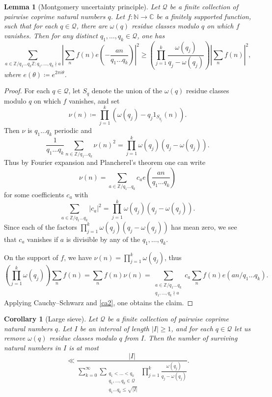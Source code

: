 \documentclass[12pt]{amsart}
\newtheorem{lemma}[theorem]{Lemma}
\newtheorem{corollary}[theorem]{Corollary}
\newcommand{\C}{\mathbb{C}}
\newcommand{\N}{\mathbb{N}}
\newcommand{\Z}{\mathbb{Z}}
\begin{document}
\begin{lemma}[Montgomery uncertainty principle]\label{montgomery} Let ${\mathcal Q}$ be a finite collection of pairwise coprime natural numbers $q$.  Let $f \colon \N \to \C$ be a finitely supported function, such that for each $q \in {\mathcal Q}$, there are $\omega(q)$ residue classes modulo $q$ on which $f$ vanishes.  Then for any distinct $q_1,\dots,q_k \in {\mathcal Q}$, one has
$$ \sum_{a \in \Z/q_1 \dots q_k\Z: q_1,\dots,q_k \nmid a} \left|\sum_n f(n) e\left(-\frac{an}{q_1 \dots q_k}\right)\right|^2 \geq \left(\prod_{j=1}^k \frac{\omega(q_j)}{q_j-\omega(q_j)}\right) |\sum_n f(n)|^2,$$
where $e(\theta) \coloneqq e^{2\pi i \theta}$.
\end{lemma}

\begin{proof}  For each $q \in {\mathcal Q}$, let $S_q$ denote the union of the $\omega(q)$ residue classes modulo $q$ on which $f$ vanishes, and set
$$ \nu(n) \coloneqq \prod_{j=1}^k (\omega(q_j) - q_j 1_{S_{q_j}}(n)).$$
Then $\nu$ is $q_1 \dots q_k$ periodic and
$$ \frac{1}{q_1 \dots q_k} \sum_{n \in \Z/q_1 \dots q_k} \nu(n)^2 = \prod_{j=1}^k \omega(q_j) (q_j - \omega(q_j)).$$
Thus by Fourier expansion and Plancherel's theorem one can write
$$ \nu(n) = \sum_{a \in \Z/q_1 \dots q_k} c_a e\left(\frac{an}{q_1 \dots q_k}\right)$$
for some coefficients $c_a$ with
\begin{equation}\label{ca2}
 \sum_{a \in \Z/q_1 \dots q_k} |c_a|^2 =  \prod_{j=1}^k \omega(q_j) (q_j - \omega(q_j)).
\end{equation}
Since each of the factors $\prod_{j=1}^k \omega(q_j) (q_j - \omega(q_j))$ has mean zero, we see that $c_a$ vanishes if $a$ is divisible by any of the $q_1,\dots,q_k$.

On the support of $f$, we have $\nu(n) = \prod_{j=1}^k \omega(q_j)$, thus
$$ \left(\prod_{j=1}^k \omega(q_j)\right) \sum_n f(n) = \sum_n f(n) \nu(n) = \sum_{\substack{a \in \Z/q_1 \dots q_k\\q_1,\dots,q_k \nmid a}} c_a \sum_n f(n) e(an/q_1 \dots q_k).$$
Applying Cauchy--Schwarz and \eqref{ca2}, one obtains the claim.
\end{proof}

\begin{corollary}[Large sieve]\label{sieve} Let ${\mathcal Q}$ be a finite collection of pairwise coprime natural numbers $q$.  Let $I$ be an interval of length $|I| \geq 1$, and for each $q \in {\mathcal Q}$ let us remove $\omega(q)$ residue classes modulo $q$ from $I$.  Then the number of surviving natural numbers in $I$ is at most
$$ \ll \frac{|I|}{\sum_{k=0}^\infty \sum_{\substack{q_1<\dots<q_k\\q_1,\dots,q_k \in {\mathcal Q}\\q_1 \dots q_k \leq \sqrt{|I|}}}
\prod_{j=1}^k \frac{\omega(q_j)}{q_j - \omega(q_j)}}.$$
\end{corollary}
\end{document}
